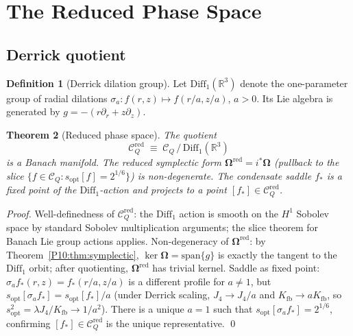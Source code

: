 \documentclass[11pt,a4paper]{article}
\newtheorem{theorem}{Theorem}[section]
\theoremstyle{definition}
\newtheorem{definition}[theorem]{Definition}
\theoremstyle{remark}
\newcommand{\lam}{\lambda}
\newcommand{\Kfb}{K_{\mathrm{fb}}}
\newcommand{\sopt}{s_{\mathrm{opt}}}
\newcommand{\RR}{\mathbb{R}}
\newcommand{\CQ}{\mathcal{C}_Q}
\newcommand{\CQr}{\mathcal{C}_Q^{\mathrm{red}}}
\newcommand{\bOmega}{\boldsymbol{\Omega}}
\begin{document}
\section{The Reduced Phase Space}
\label{P10:sec:reduction}

\subsection{Derrick quotient}
\label{P10:sec:derrick}

\begin{definition}[Derrick dilation group]
\label{P10:def:derrick_dilation}
Let $\mathrm{Diff}_1(\RR^3)$ denote the one-parameter group of
radial dilations $\sigma_a: f(r,z)\mapsto f(r/a,z/a)$, $a>0$.
Its Lie algebra is generated by $g = -(r\partial_r + z\partial_z)$.
\end{definition}

\begin{theorem}[Reduced phase space]
\label{P10:thm:reduction}
The quotient
\begin{equation}
  \CQr \;\equiv\; \CQ\,/\,\mathrm{Diff}_1(\RR^3)
  \label{P10:eq:reduced}
\end{equation}
is a Banach manifold.
The reduced symplectic form
$\bOmega^{\mathrm{red}} = i^*\bOmega$ (pullback
to the slice $\{f\in\CQ : \sopt[f] = 2^{1/6}\}$)
is non-degenerate.
The condensate saddle $f_*$ is a fixed point of the
$\mathrm{Diff}_1$-action and projects to a point
$[f_*]\in\CQr$.
\end{theorem}

\begin{proof}
Well-definedness of $\CQr$: the $\mathrm{Diff}_1$ action is
smooth on the $H^1$ Sobolev space by standard Sobolev multiplication
arguments; the slice theorem for Banach Lie group actions applies.
Non-degeneracy of $\bOmega^{\mathrm{red}}$:
by Theorem~\ref{P10:thm:symplectic}, $\ker\bOmega =
\mathrm{span}\{g\}$ is exactly the tangent to the
$\mathrm{Diff}_1$ orbit; after quotienting, $\bOmega^{\mathrm{red}}$
has trivial kernel.
Saddle as fixed point: $\sigma_a f_*(r,z) = f_*(r/a,z/a)$ is a
different profile for $a\neq1$, but $\sopt[\sigma_a f_*] = \sopt[f_*]/a$
(under Derrick scaling, $J_4\to J_4/a$ and $\Kfb\to a\Kfb$, so
$\sopt^2 = \lam J_4/\Kfb\to 1/a^2$).
There is a unique $a=1$ such that $\sopt[\sigma_a f_*]=2^{1/6}$,
confirming $[f_*]\in\CQr$ is the unique representative.
\qed
\end{proof}
\end{document}
